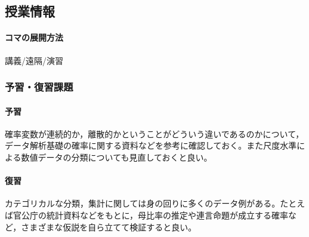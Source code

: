 \subsection{授業情報}
\paragraph{コマの展開方法}
講義/遠隔/演習
\subsubsection{予習・復習課題}
\paragraph{予習}確率変数が連続的か，離散的かということがどういう違いであるのかについて，データ解析基礎の確率に関する資料などを参考に確認しておく。また尺度水準による数値データの分類についても見直しておくと良い。
\paragraph{復習}カテゴリカルな分類，集計に関しては身の回りに多くのデータ例がある。たとえば官公庁の統計資料などをもとに，母比率の推定や連言命題が成立する確率など，さまざまな仮説を自ら立てて検証すると良い。